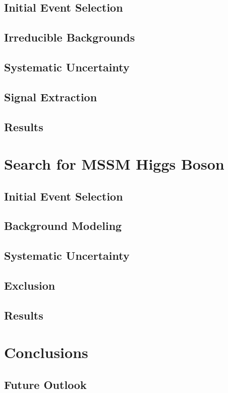 \documentclass[oneside, letterpaper, 12pt, oldfontcommands]{memoir}
\begin{document}
\section{Initial Event Selection}
\section{Irreducible Backgrounds}
\section{Systematic Uncertainty}
\section{Signal Extraction}
\section{Results}

\chapter{Search for MSSM Higgs Boson}
\section{Initial Event Selection}
\section{Background Modeling}
\section{Systematic Uncertainty}
\section{Exclusion}
\section{Results}


\chapter{Conclusions}
\section{Future Outlook}
\end{document}
